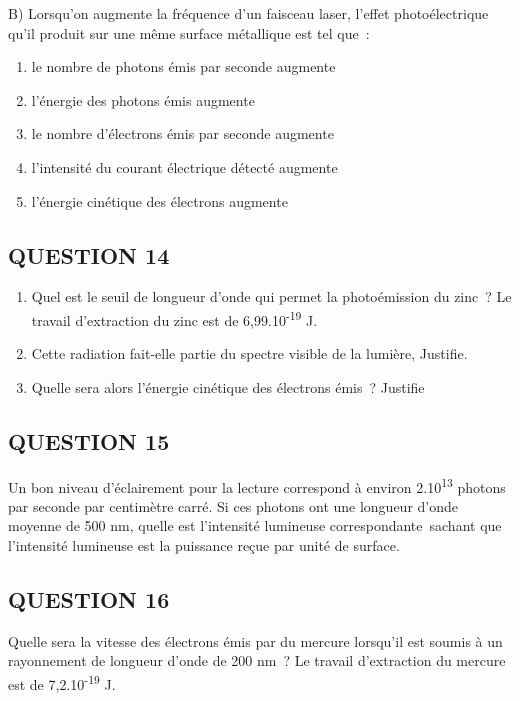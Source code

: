 {B) Lorsqu'on augmente la fréquence d'un faisceau laser, l'effet
photoélectrique qu'il produit sur une même surface métallique est tel
que~:
\begin{enumerate}
  \item    le nombre de photons émis par seconde augmente
  \item    l'énergie des photons émis augmente
  \item  le nombre d'électrons émis par seconde augmente
  \item    l'intensité du courant électrique détecté augmente
  \item    l'énergie cinétique des électrons augmente
\end{enumerate}

\subsection{QUESTION 14}

\begin{enumerate}
\item  Quel est le seuil de longueur d'onde qui permet la photoémission du
  zinc~? Le travail d'extraction du zinc est de
  6,99.10\textsuperscript{-19} J.
\item  Cette radiation fait-elle partie du spectre visible de la lumière,
  Justifie.
\item  Quelle sera alors l'énergie cinétique des électrons émis~? Justifie
\end{enumerate}

\subsection{QUESTION 15}

Un bon niveau d'éclairement pour la lecture correspond à environ
2.10\textsuperscript{13} photons par seconde par centimètre carré. Si
ces photons ont une longueur d'onde moyenne de 500 nm, quelle est
l'intensité lumineuse correspondante~sachant que l'intensité lumineuse
est la puissance reçue par unité de surface.

\subsection{QUESTION 16}

Quelle sera la vitesse des électrons émis par du mercure lorsqu'il est
soumis à un rayonnement de longueur d'onde de 200 nm~? Le travail
d'extraction du mercure est de 7,2.10\textsuperscript{-19} J.

}
